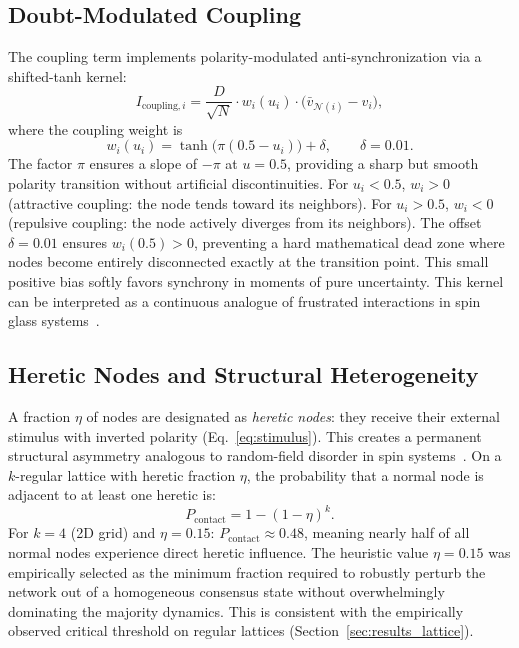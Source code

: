 ﻿\documentclass[11pt]{article}
\begin{document}
\subsection{Doubt-Modulated Coupling}

The coupling term implements polarity-modulated anti-synchronization via a shifted-tanh kernel:
\begin{equation}
I_{\text{coupling},i} = \frac{D}{\sqrt{N}} \cdot w_i(u_i) \cdot \bigl(\bar{v}_{\mathcal{N}(i)} - v_i\bigr),
\label{eq:coupling}
\end{equation}
where the coupling weight is
\begin{equation}
w_i(u_i) = \tanh\bigl(\pi(0.5 - u_i)\bigr) + \delta, \qquad \delta = 0.01.
\label{eq:sigmoid}
\end{equation}
The factor $\pi$ ensures a slope of $-\pi$ at $u=0.5$, providing a sharp but smooth polarity transition without artificial discontinuities. For $u_i < 0.5$, $w_i > 0$ (attractive coupling: the node tends toward its neighbors). For $u_i > 0.5$, $w_i < 0$ (repulsive coupling: the node actively diverges from its neighbors). The offset $\delta = 0.01$ ensures $w_i(0.5) > 0$, preventing a hard mathematical dead zone where nodes become entirely disconnected exactly at the transition point. This small positive bias softly favors synchrony in moments of pure uncertainty. This kernel can be interpreted as a continuous analogue of frustrated interactions in spin glass systems~\cite{toulouse1977,odor2024}.

\subsection{Heretic Nodes and Structural Heterogeneity}

A fraction $\eta$ of nodes are designated as \textit{heretic nodes}: they receive their external stimulus with inverted polarity (Eq.~\ref{eq:stimulus}). This creates a permanent structural asymmetry analogous to random-field disorder in spin systems~\cite{nattermann1998}. On a $k$-regular lattice with heretic fraction $\eta$, the probability that a normal node is adjacent to at least one heretic is:
\begin{equation}
P_{\text{contact}} = 1 - (1-\eta)^k.
\label{eq:percolation}
\end{equation}
For $k=4$ (2D grid) and $\eta = 0.15$: $P_{\text{contact}} \approx 0.48$, meaning nearly half of all normal nodes experience direct heretic influence. The heuristic value $\eta = 0.15$ was empirically selected as the minimum fraction required to robustly perturb the network out of a homogeneous consensus state without overwhelmingly dominating the majority dynamics. This is consistent with the empirically observed critical threshold on regular lattices (Section~\ref{sec:results_lattice}).
\end{document}

